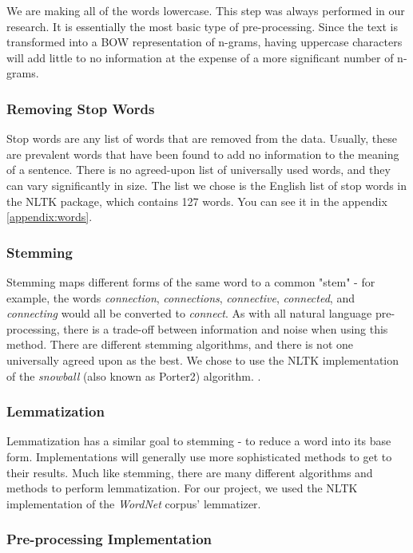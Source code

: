 \documentclass[a4paper, 11pt]{article}
\begin{document}
\begin{multicols}{2}
We are making all of the words lowercase. This step was always performed in our research. It is essentially the most basic type of pre-processing. Since the text is transformed into a BOW representation of n-grams, having uppercase characters will add little to no information at the expense of a more significant number of n-grams.

\subsubsection{Removing Stop Words}
Stop words are any list of words that are removed from the data. Usually, these are prevalent words that have been found to add no information to the meaning of a sentence. There is no agreed-upon list of universally used words, and they can vary significantly in size. The list we chose is the English list of stop words in the NLTK package, which contains 127 words. You can see it in the appendix \ref{appendix:words}. 

\subsubsection{Stemming}
Stemming maps different forms of the same word to a common "stem" - for example, the words \emph{connection}, \emph{connections}, \emph{connective}, \emph{connected}, and \emph{connecting} would all be converted to \emph{connect}. As with all natural language pre-processing, there is a trade-off between information and noise when using this method. There are different stemming algorithms, and there is not one universally agreed upon as the best. We chose to use the NLTK implementation of the \emph{snowball} (also known as Porter2) algorithm. \cite{porter1980algorithm}.

\subsubsection{Lemmatization}
Lemmatization has a similar goal to stemming - to reduce a word into its base form. Implementations will generally use more sophisticated methods to get to their results. Much like stemming, there are many different algorithms and methods to perform lemmatization. For our project, we used the NLTK implementation of the \emph{WordNet} corpus' lemmatizer.\cite{porter1980algorithm}

\end{multicols}
\subsubsection{Pre-processing Implementation}
\end{document}
